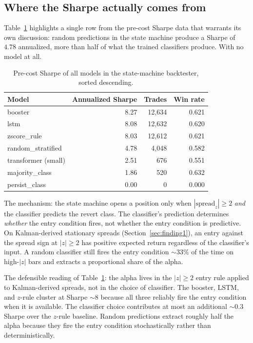 \documentclass[11pt]{article}
\begin{document}
\subsection{Where the Sharpe actually comes from} \label{sec:where}

Table~\ref{tab:where} highlights a single row from the pre-cost
Sharpe data that warrants its own discussion: random predictions in
the state machine produce a Sharpe of $4.78$ annualized, more than
half of what the trained classifiers produce. With no model at all.

\begin{table}[h]
\centering
\caption{Pre-cost Sharpe of all models in the state-machine backtester,
sorted descending.}
\label{tab:where}
\small
\begin{tabular}{lrrr}
\toprule
Model & Annualized Sharpe & Trades & Win rate \\
\midrule
booster              & 8.27 & 12{,}634 & 0.621 \\
lstm                 & 8.08 & 12{,}632 & 0.620 \\
zscore\_rule         & 8.03 & 12{,}612 & 0.621 \\
random\_stratified   & 4.78 &  4{,}048 & 0.582 \\
transformer (small)  & 2.51 &     676 & 0.551 \\
majority\_class      & 1.86 &     520 & 0.632 \\
persist\_class       & 0.00 &       0 & 0.000 \\
\bottomrule
\end{tabular}
\end{table}

The mechanism: the state machine opens a position only when
$|\text{spread}_z| \geq 2$ \emph{and} the classifier predicts the
revert class. The classifier's prediction determines \emph{whether}
the entry condition fires, not whether the entry condition is
predictive. On Kalman-derived stationary spreads
(Section~\ref{sec:finding1}), an entry against the spread sign at
$|z| \geq 2$ has positive expected return regardless of the
classifier's input. A random classifier still fires the entry
condition $\sim$33\% of the time on high-$|z|$ bars and extracts a
proportional share of the alpha.

The defensible reading of Table~\ref{tab:where}: the alpha lives in
the $|z| \geq 2$ entry rule applied to Kalman-derived spreads, not in
the choice of classifier. The booster, LSTM, and $z$-rule cluster at
Sharpe $\sim$8 because all three reliably fire the entry condition
when it is available. The classifier choice contributes at most an
additional $\sim$0.3 Sharpe over the $z$-rule baseline. Random
predictions extract roughly half the alpha because they fire the
entry condition stochastically rather than deterministically.
\end{document}
